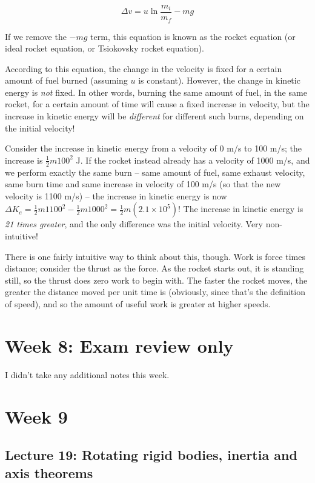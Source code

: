 \documentclass[12pt,a4paper]{report}
\begin{document}
\begin{equation}
\Delta v = u \ln \frac{m_i}{m_f} - m g
\end{equation}

If we remove the $- m g$ term, this equation is known as the rocket equation (or ideal rocket equation, or Tsiokovsky rocket equation).

According to this equation, the change in the velocity is fixed for a certain amount of fuel burned (assuming $u$ is constant). However, the change in kinetic energy is \emph{not} fixed. In other words, burning the same amount of fuel, in the same rocket, for a certain amount of time will cause a fixed increase in velocity, but the increase in kinetic energy will be \emph{different} for different such burns, depending on the initial velocity!

Consider the increase in kinetic energy from a velocity of 0 m/s to 100 m/s; the increase is $\frac{1}{2} m 100^2$ J. If the rocket instead already has a velocity of 1000 m/s, and we perform exactly the same burn -- same amount of fuel, same exhaust velocity, same burn time and same increase in velocity of 100 m/s (so that the new velocity is 1100 m/s) -- the increase in kinetic energy is now $\Delta K_e = \frac{1}{2} m 1100^2 - \frac{1}{2} m 1000^2 = \frac{1}{2} m (2.1 \times 10^5)$! The increase in kinetic energy is \emph{21 times greater}, and the only difference was the initial velocity. Very non-intuitive!

There is one fairly intuitive way to think about this, though. Work is force times distance; consider the thrust as the force. As the rocket starts out, it is standing still, so the thrust does zero work to begin with. The faster the rocket moves, the greater the distance moved per unit time is (obviously, since that's the definition of speed), and so the amount of useful work is greater at higher speeds.

\chapter{Week 8: Exam review only}

I didn't take any additional notes this week.


\chapter{Week 9}

\section{Lecture 19: Rotating rigid bodies, inertia and axis theorems}
\end{document}
